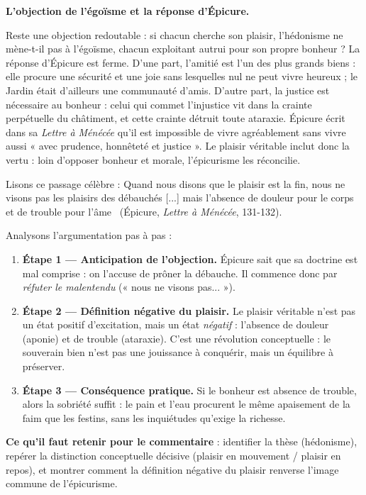 \documentclass[11pt]{article}
\newcommand{\cle}[1]{{\popxbold\color{popdark}#1}}
\begin{document}
\textbf{L'objection de l'égoïsme et la réponse d'Épicure.}\par
Reste une objection redoutable : si chacun cherche son plaisir, l'hédonisme ne mène-t-il pas à l'égoïsme, chacun exploitant autrui pour son propre bonheur ? La réponse d'Épicure est ferme. D'une part, l'\cle{amitié} est l'un des plus grands biens : elle procure une sécurité et une joie sans lesquelles nul ne peut vivre heureux ; le Jardin était d'ailleurs une communauté d'amis. D'autre part, la \cle{justice} est nécessaire au bonheur : celui qui commet l'injustice vit dans la crainte perpétuelle du châtiment, et cette crainte détruit toute ataraxie. Épicure écrit dans sa \emph{Lettre à Ménécée} qu'il est impossible de vivre agréablement sans vivre aussi « avec prudence, honnêteté et justice ». Le plaisir véritable inclut donc la vertu : loin d'opposer bonheur et morale, l'épicurisme les réconcilie.

\begin{experience}
Lisons ce passage célèbre : \guillemotleft Quand nous disons que le plaisir est la fin, nous ne visons pas les plaisirs des débauchés [...] mais l'absence de douleur pour le corps et de trouble pour l'âme \guillemotright\ (Épicure, \emph{Lettre à Ménécée}, 131-132).

Analysons l'argumentation pas à pas :
\begin{enumerate}
\item \textbf{Étape 1 — Anticipation de l'objection.} Épicure sait que sa doctrine est mal comprise : on l'accuse de prôner la débauche. Il commence donc par \emph{réfuter le malentendu} (« nous ne visons pas... »).
\item \textbf{Étape 2 — Définition négative du plaisir.} Le plaisir véritable n'est pas un état positif d'excitation, mais un état \emph{négatif} : l'absence de douleur (aponie) et de trouble (ataraxie). C'est une révolution conceptuelle : le souverain bien n'est pas une jouissance à conquérir, mais un équilibre à préserver.
\item \textbf{Étape 3 — Conséquence pratique.} Si le bonheur est absence de trouble, alors la sobriété suffit : le pain et l'eau procurent le même apaisement de la faim que les festins, sans les inquiétudes qu'exige la richesse.
\end{enumerate}
\textbf{Ce qu'il faut retenir pour le commentaire} : identifier la thèse (hédonisme), repérer la distinction conceptuelle décisive (plaisir en mouvement / plaisir en repos), et montrer comment la définition négative du plaisir renverse l'image commune de l'épicurisme.
\end{experience}
\end{document}
